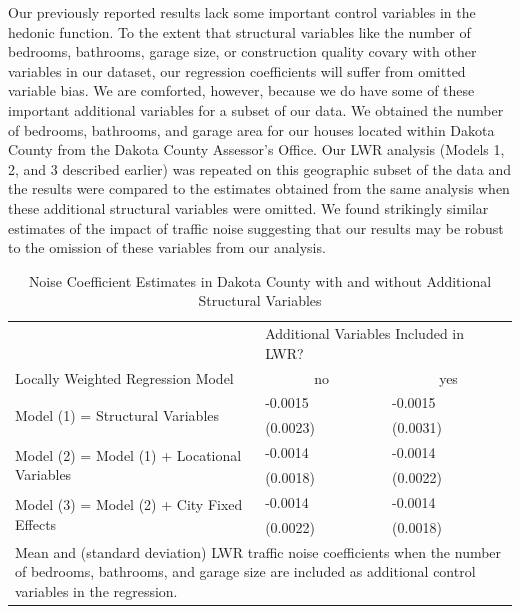 \documentclass{article}\usepackage{graphicx, color}
\begin{document}
Our previously reported results lack some important control variables in the hedonic function. To the extent that structural variables like the number of bedrooms, bathrooms, garage size, or construction quality covary with other variables in our dataset, our regression coefficients will suffer from omitted variable bias. We are comforted, however, because we do have some of these important additional variables for a subset of our data. We obtained the number of bedrooms, bathrooms, and garage area for our houses located within Dakota County from the Dakota County Assessor's Office. Our LWR analysis (Models 1, 2, and 3 described earlier) was repeated on this geographic subset of the data and the results were compared to the estimates obtained from the same analysis when these additional structural variables were omitted. We found strikingly similar estimates of the impact of traffic noise suggesting that our results may be robust to the omission of these variables from our analysis.

\begin{table}[ht]
\begin{center}
\caption{Noise Coefficient Estimates in Dakota County with and without Additional Structural Variables}\label{tab:Dak}
\begin{tabular}{lll}
 & \multicolumn{2}{p{1.25in}}{Additional Variables Included in LWR?} \\
Locally Weighted Regression Model & \multicolumn{1}{c}{no} & \multicolumn{1}{c}{yes} \\ \cline{1-3}
\multirow{2}{*}{Model (1) = Structural Variables} & -0.0015 & -0.0015 \\ 
   & (0.0023) & (0.0031)  \\[.2cm]
\multirow{2}{*}{Model (2) = Model (1) + Locational Variables} & -0.0014 & -0.0014  \\ 
   & (0.0018) & (0.0022)  \\[.2cm] 
\multirow{2}{*}{Model (3) = Model (2) + City Fixed Effects} & -0.0014 & -0.0014 \\ 
   & (0.0022) & (0.0018) \\[.2cm] \cline{1-3}
\multicolumn{3}{p{4.25in}}{Mean and (standard deviation) LWR traffic noise coefficients when the number of bedrooms, bathrooms, and garage size are included as additional control variables in the regression.}
\end{tabular}
\end{center}
\end{table}
\end{document}
